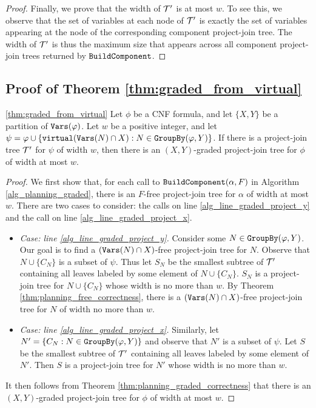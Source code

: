 \begin{proof}
Finally, we prove that the width of $\mathcal{T}'$ is at most $w$. To see this, we observe that the set of variables at each node of $\mathcal{T}'$ is exactly the set of variables appearing at the node of the corresponding component project-join tree. The width of $\mathcal{T}'$ is thus the maximum size that appears across all component project-join trees returned by $\texttt{\upshape BuildComponent}$. 
\end{proof}

\subsection{Proof of Theorem \ref{thm:graded_from_virtual}}
\begin{theorem}{\ref{thm:graded_from_virtual}}
Let $\phi$ be a CNF formula, and let $\{X, Y\}$ be a partition of $\texttt{\upshape Vars}(\varphi)$.
Let $w$ be a positive integer, and let $\psi = \varphi \cup \{\texttt{\upshape virtual}(\texttt{\upshape Vars}(N)\cap X) : N \in \texttt{\upshape GroupBy}(\varphi, Y)\}$.
If there is a project-join tree $\mathcal{T}'$ for $\psi$ of width $w$, then there is an $(X,Y)$-graded project-join tree for $\phi$ of width at most $w$.
\end{theorem}
\begin{proof}
We first show that, for each call to $\texttt{\upshape BuildComponent}(\alpha, F)$ in Algorithm \ref{alg_planning_graded}, there is an $F$-free project-join tree for $\alpha$ of width at most $w$. There are two cases to consider: the calls on line \ref{alg_line_graded_project_y} and the call on line \ref{alg_line_graded_project_x}.
\begin{itemize}
    \item \textit{Case: line \ref{alg_line_graded_project_y}.} Consider some $N \in \texttt{\upshape GroupBy}(\varphi, Y)$. Our goal is to find a $(\texttt{\upshape Vars}(N) \cap X)$-free project-join tree for $N$. Observe that $N \cup \{C_N\}$ is a subset of $\psi$. Thus let $S_N$ be the smallest subtree of $\mathcal{T}'$ containing all leaves labeled by some element of $N \cup \{C_N\}$. $S_N$ is a project-join tree for $N \cup \{C_N\}$ whose width is no more than $w$. By Theorem  \ref{thm:planning_free_correctness}, there is a $(\texttt{\upshape Vars}(N) \cap X)$-free project-join tree for $N$ of width no more than $w$.
    
    \item \textit{Case: line \ref{alg_line_graded_project_x}.} Similarly, let $N' = \{C_N : N \in \texttt{\upshape GroupBy}(\varphi, Y)\}$ and observe that $N'$ is a subset of $\psi$. Let $S$ be the smallest subtree of $\mathcal{T}'$ containing all leaves labeled by some element of $N'$. Then $S$ is a project-join tree for $N'$ whose width is no more than $w$. 
\end{itemize}

It then follows from Theorem \ref{thm:planning_graded_correctness} that there is an $(X,Y)$-graded project-join tree for $\phi$ of width at most $w$. 
\end{proof}

